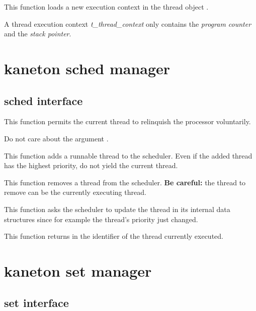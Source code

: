 	 {
	   This function loads a new execution context in the thread
	   object .

	   A thread execution context \textit{t\_thread\_context}
	   only contains the \textit{program counter} and the
	   \textit{stack pointer}.
	 }

\newpage

\section{kaneton sched manager}

\subsection*{sched interface}

	 {
	   This function permits the current thread to relinquish
	   the processor voluntarily.

	   Do not care about the argument .
	 }

	 {
	   This function adds a runnable thread to the scheduler. Even
	   if the added thread has the highest priority, do not yield
	   the current thread.
	 }

	 {
	   This function removes a thread from the
	   scheduler. \textbf{Be careful:} the thread to remove can be
	   the currently executing thread.
	 }

	 {
	   This function asks the scheduler to update the thread
	    in its internal data structures since
	   for example the thread's priority just changed.
	 }

	 {
	   This function returns in  the identifier
	   of the thread currently executed.
	 }

\section{kaneton set manager}

\subsection*{set interface}

